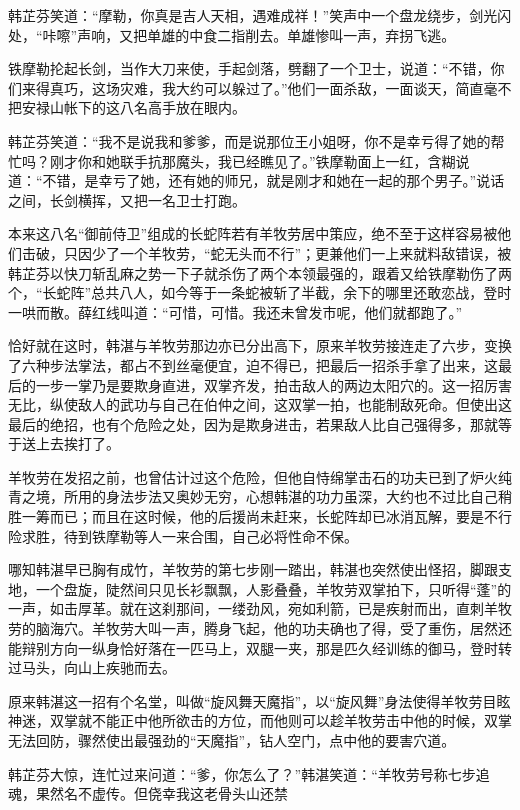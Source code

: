 \documentclass[12pt,oneside]{book}
\begin{document}
韩芷芬笑道：``摩勒，你真是吉人天相，遇难成祥！''笑声中一个盘龙绕步，剑光闪处，``咔嚓''声响，又把单雄的中食二指削去。单雄惨叫一声，弃拐飞逃。

铁摩勒抡起长剑，当作大刀来使，手起剑落，劈翻了一个卫士，说道：``不错，你们来得真巧，这场灾难，我大约可以躲过了。''他们一面杀敌，一面谈天，简直毫不把安禄山帐下的这八名高手放在眼内。

韩芷芬笑道：``我不是说我和爹爹，而是说那位王小姐呀，你不是幸亏得了她的帮忙吗？刚才你和她联手抗那魔头，我已经瞧见了。''铁摩勒面上一红，含糊说道：``不错，是幸亏了她，还有她的师兄，就是刚才和她在一起的那个男子。''说话之间，长剑横挥，又把一名卫士打跑。

本来这八名``御前侍卫''组成的长蛇阵若有羊牧劳居中策应，绝不至于这样容易被他们击破，只因少了一个羊牧劳，``蛇无头而不行''；更兼他们一上来就料敌错误，被韩芷芬以快刀斩乱麻之势一下子就杀伤了两个本领最强的，跟着又给铁摩勒伤了两个，``长蛇阵''总共八人，如今等于一条蛇被斩了半截，余下的哪里还敢恋战，登时一哄而散。薛红线叫道：``可惜，可惜。我还未曾发市呢，他们就都跑了。''

恰好就在这时，韩湛与羊牧劳那边亦已分出高下，原来羊牧劳接连走了六步，变换了六种步法掌法，都占不到丝毫便宜，迫不得已，把最后一招杀手拿了出来，这最后的一步一掌乃是要欺身直进，双掌齐发，拍击敌人的两边太阳穴的。这一招厉害无比，纵使敌人的武功与自己在伯仲之间，这双掌一拍，也能制敌死命。但使出这最后的绝招，也有个危险之处，因为是欺身进击，若果敌人比自己强得多，那就等于送上去挨打了。

羊牧劳在发招之前，也曾估计过这个危险，但他自恃绵掌击石的功夫已到了炉火纯青之境，所用的身法步法又奥妙无穷，心想韩湛的功力虽深，大约也不过比自己稍胜一筹而已；而且在这时候，他的后援尚未赶来，长蛇阵却已冰消瓦解，要是不行险求胜，待到铁摩勒等人一来合围，自己必将性命不保。

哪知韩湛早已胸有成竹，羊牧劳的第七步刚一踏出，韩湛也突然使出怪招，脚跟支地，一个盘旋，陡然间只见长衫飘飘，人影叠叠，羊牧劳双掌拍下，只听得``蓬''的一声，如击厚革。就在这刹那间，一缕劲风，宛如利箭，已是疾射而出，直刺羊牧劳的脑海穴。羊牧劳大叫一声，腾身飞起，他的功夫确也了得，受了重伤，居然还能辩别方向一纵身恰好落在一匹马上，双腿一夹，那是匹久经训练的御马，登时转过马头，向山上疾驰而去。

原来韩湛这一招有个名堂，叫做``旋风舞天魔指''，以``旋风舞''身法使得羊牧劳目眩神迷，双掌就不能正中他所欲击的方位，而他则可以趁羊牧劳击中他的时候，双掌无法回防，骤然使出最强劲的``天魔指''，钻人空门，点中他的要害穴道。

韩芷芬大惊，连忙过来问道：``爹，你怎么了？''韩湛笑道：``羊牧劳号称七步追魂，果然名不虚传。但侥幸我这老骨头山还禁
\end{document}
